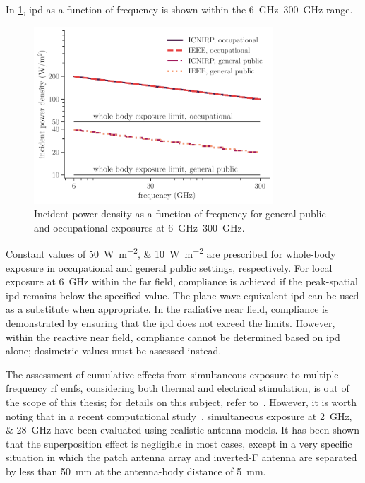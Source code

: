 In \cref{fig:reference_levels}, \gls{ipd} as a function of frequency is shown within the \SIrange{6}{300}{\GHz} range.
\begin{figure}[t]
    \centering
    \includegraphics[width=0.8\textwidth]{artwork/reference_levels.pdf}
    \caption{Incident power density as a function of frequency for general public and occupational exposures at \SIrange{6}{300}{\GHz}.}
    \label{fig:reference_levels}
\end{figure}
Constant values of \SIlist{50;10}{\watt\per\m\squared} are prescribed for whole-body exposure in occupational and general public settings, respectively.
For local exposure at \SI{6}{\GHz} within the far field, compliance is achieved if the peak-spatial \gls{ipd} remains below the specified value.
The plane-wave equivalent \gls{ipd} can be used as a substitute when appropriate.
In the radiative near field, compliance is demonstrated by ensuring that the \gls{ipd} does not exceed the limits.
However, within the reactive near field, compliance cannot be determined based on \gls{ipd} alone; dosimetric values must be assessed instead.

The assessment of cumulative effects from simultaneous exposure to multiple frequency \gls{rf} \gls{emf}s, considering both thermal and electrical stimulation, is out of the scope of this thesis; for details on this subject, refer to~\cite{ICNIRP2020Guidelines, IEEE2019Standard}.
However, it is worth noting that in a recent computational study~\cite{Miura2021Power}, simultaneous exposure at \SIlist{2;28}{\GHz} have been evaluated using realistic antenna models.
It has been shown that the superposition effect is negligible in most cases, except in a very specific situation in which the patch antenna array and inverted-F antenna are separated by less than \SI{50}{\mm} at the antenna-body distance of \SI{5}{\mm}.
